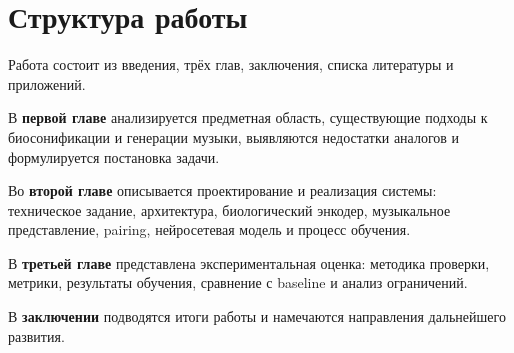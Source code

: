 \section*{Структура работы}

Работа состоит из введения, трёх глав, заключения, списка литературы и приложений.

В \textbf{первой главе} анализируется предметная область, существующие подходы к биосонификации и генерации музыки, выявляются недостатки аналогов и формулируется постановка задачи.

Во \textbf{второй главе} описывается проектирование и реализация системы: техническое задание, архитектура, биологический энкодер, музыкальное представление, pairing, нейросетевая модель и процесс обучения.

В \textbf{третьей главе} представлена экспериментальная оценка: методика проверки, метрики, результаты обучения, сравнение с baseline и анализ ограничений.

В \textbf{заключении} подводятся итоги работы и намечаются направления дальнейшего развития.
